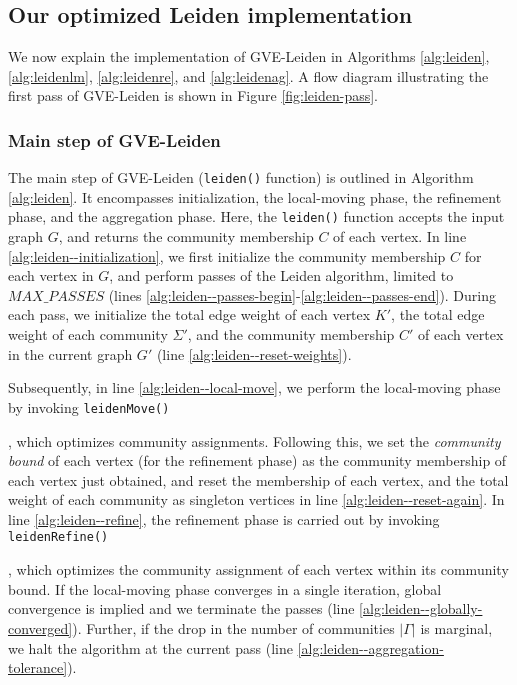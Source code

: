 







\subsection{Our optimized Leiden implementation}

We now explain the implementation of GVE-Leiden in Algorithms \ref{alg:leiden}, \ref{alg:leidenlm}, \ref{alg:leidenre}, and \ref{alg:leidenag}. A flow diagram illustrating the first pass of GVE-Leiden is shown in Figure \ref{fig:leiden-pass}.


\subsubsection{Main step of GVE-Leiden}

The main step of GVE-Leiden (\texttt{leiden()} function) is outlined in Algorithm \ref{alg:leiden}. It encompasses initialization, the local-moving phase, the refinement phase, and the aggregation phase. Here, the \texttt{leiden()} function accepts the input graph $G$, and returns the community membership $C$ of each vertex. In line \ref{alg:leiden--initialization}, we first initialize the community membership $C$ for each vertex in $G$, and perform passes of the Leiden algorithm, limited to $MAX\_PASSES$ (lines \ref{alg:leiden--passes-begin}-\ref{alg:leiden--passes-end}). During each pass, we initialize the total edge weight of each vertex $K'$, the total edge weight of each community $\Sigma'$, and the community membership $C'$ of each vertex in the current graph $G'$ (line \ref{alg:leiden--reset-weights}).

Subsequently, in line \ref{alg:leiden--local-move}, we perform the local-moving phase by invoking \texttt{leidenMove()}, which optimizes community assignments. Following this, we set the \textit{community bound} of each vertex (for the refinement phase) as the community membership of each vertex just obtained, and reset the membership of each vertex, and the total weight of each community as singleton vertices in line \ref{alg:leiden--reset-again}. In line \ref{alg:leiden--refine}, the refinement phase is carried out by invoking \texttt{leidenRefine()}, which optimizes the community assignment of each vertex within its community bound. If the local-moving phase converges in a single iteration, global convergence is implied and we terminate the passes (line \ref{alg:leiden--globally-converged}). Further, if the drop in the number of communities $|\Gamma|$ is marginal, we halt the algorithm at the current pass (line \ref{alg:leiden--aggregation-tolerance}).

